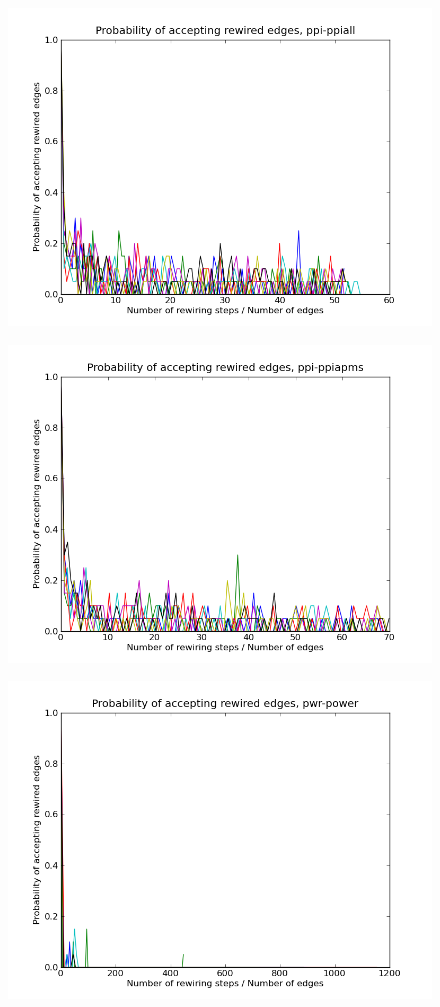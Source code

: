 \documentclass[12pt]{article}
\begin{document}
\begin{figure}[p]
\includegraphics[scale=0.75]{Paccept-ppi-ppiall.png}\\
\end{figure}


\begin{figure}[p]
\includegraphics[scale=0.75]{Paccept-ppi-ppiapms.png}\\
\end{figure}


\begin{figure}[p]
\includegraphics[scale=0.75]{Paccept-pwr-power.png}\\
\end{figure}
\end{document}
